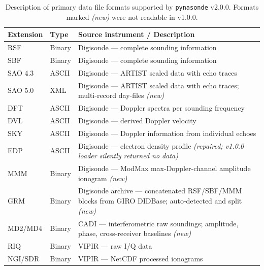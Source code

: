 \documentclass[12pt,a4paper]{article}
\begin{document}
\begin{table}[h!]
\caption{Description of primary data file formats supported by
\texttt{pynasonde} v2.0.0. Formats marked \emph{(new)} were not readable in
v1.0.0.}
\label{tab:formats}
\centering
\begin{tabular}{@{}llp{6.3cm}@{}}
\toprule
\textbf{Extension} & \textbf{Type} & \textbf{Source instrument / Description} \\
\midrule
RSF        & Binary & Digisonde --- complete sounding information \\
SBF        & Binary & Digisonde --- complete sounding information \\
SAO 4.3    & ASCII  & Digisonde --- ARTIST scaled data with echo traces \\
SAO 5.0    & XML    & Digisonde --- ARTIST scaled data with echo traces; multi-record day-files \emph{(new)} \\
DFT        & ASCII  & Digisonde --- Doppler spectra per sounding frequency \\
DVL        & ASCII  & Digisonde --- derived Doppler velocity \\
SKY        & ASCII  & Digisonde --- Doppler information from individual echoes \\
EDP        & ASCII  & Digisonde --- electron density profile \emph{(repaired; v1.0.0 loader silently returned no data)} \\
MMM        & Binary & Digisonde --- ModMax max-Doppler-channel amplitude ionogram \emph{(new)} \\
GRM        & Binary & Digisonde archive --- concatenated RSF/SBF/MMM blocks from GIRO DIDBase; auto-detected and split \emph{(new)} \\
MD2/MD4    & Binary & CADI --- interferometric raw soundings; amplitude, phase, cross-receiver baselines \emph{(new)} \\
RIQ        & Binary & VIPIR --- raw I/Q data \\
NGI/SDR    & Binary & VIPIR --- NetCDF processed ionograms \\
\bottomrule
\end{tabular}
\end{table}
\end{document}
